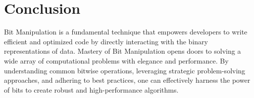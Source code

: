 \section*{Conclusion}

Bit Manipulation is a fundamental technique that empowers developers to write efficient and optimized code by directly interacting with the binary representations of data. Mastery of Bit Manipulation opens doors to solving a wide array of computational problems with elegance and performance. By understanding common bitwise operations, leveraging strategic problem-solving approaches, and adhering to best practices, one can effectively harness the power of bits to create robust and high-performance algorithms.

\printindex

